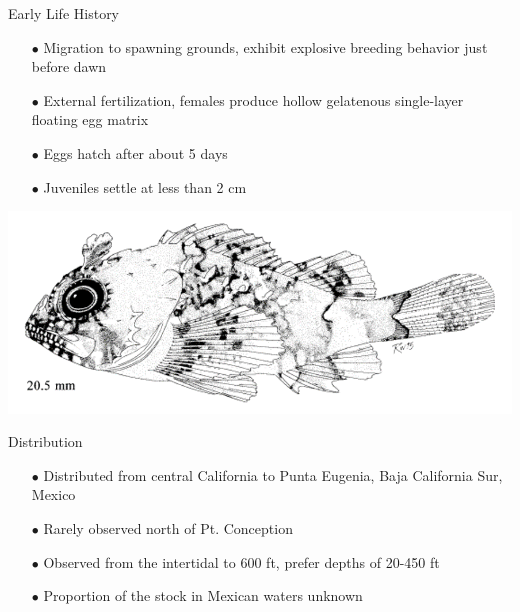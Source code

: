 \documentclass[ignorenonframetext,]{beamer}
\begin{document}
\begin{frame}{Early Life History}

\begin{itemize} 
\item[$\bullet$] Migration to spawning grounds, exhibit explosive breeding behavior just before dawn
\item[$\bullet$] External fertilization, females produce hollow gelatenous single-layer floating egg matrix
\item[$\bullet$] Eggs hatch after about 5 days
\item[$\bullet$] Juveniles settle at less than 2 cm 
\end{itemize}

\centering
\includegraphics[width=.5\textwidth]{Figures/baby_scorp}


\end{frame}

\begin{frame}{Distribution}

\begin{itemize} 
 \item[$\bullet$] Distributed from central California to Punta Eugenia, Baja California Sur, Mexico 
 \item[$\bullet$] Rarely observed north of Pt. Conception  
 \item[$\bullet$] Observed from the intertidal to 600 ft,  prefer depths of 20-450 ft  
 \item[$\bullet$] Proportion of the stock in Mexican waters unknown
\end{itemize}

\end{frame}
\end{document}
